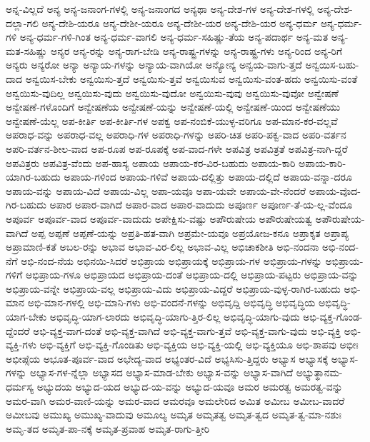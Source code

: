 {ಅನ್ನ-ವಿಲ್ಲದೆ
ಅನ್ಯ
ಅನ್ಯ-ಜನಾಂಗ-ಗಳಲ್ಲಿ
ಅನ್ಯ-ಜನಾಂಗದ
ಅನ್ಯಥಾ
ಅನ್ಯ-ದೇಶ-ಗಳ
ಅನ್ಯ-ದೇಶ-ಗಳಲ್ಲಿ
ಅನ್ಯ-ದೇಶ-ದಲ್ಲಾ-ಗಲಿ
ಅನ್ಯ-ದೇಶಿ-ಯರೂ
ಅನ್ಯ-ದೇಶೀ-ಯರೂ
ಅನ್ಯ-ದೇಶೀ-ಯರ
ಅನ್ಯ-ದೇಶಿ-ಯರ
ಅನ್ಯ-ಧರ್ಮ
ಅನ್ಯ-ಧರ್ಮ-ಗಳಿ
ಅನ್ಯ-ಧರ್ಮ-ಗಳಿ-ಗಿಂತ
ಅನ್ಯ-ಧರ್ಮ-ವಾಗಲಿ
ಅನ್ಯ-ಧರ್ಮ-ಸಹಿಷ್ಣು-ತೆಯ
ಅನ್ಯ-ಪದಾರ್ಥ
ಅನ್ಯ-ಮತ
ಅನ್ಯ-ಮತ-ಸಹಿಷ್ಣು
ಅನ್ಯರ
ಅನ್ಯ-ರನ್ನು
ಅನ್ಯ-ರಾಗ-ಬೇಡಿ
ಅನ್ಯ-ರಾಷ್ಟ್ರ-ಗಳನ್ನು
ಅನ್ಯ-ರಾಷ್ಟ್ರ-ಗಳು
ಅನ್ಯ-ರಿಂದ
ಅನ್ಯ-ರಿಗೆ
ಅನ್ಯರು
ಅನ್ಯರೋ
ಅನ್ಯಾ
ಅನ್ಯಾಯ-ಗಳನ್ನು
ಅನ್ಯಾಯ-ವಾಗಿಯೋ
ಅನ್ಯೋನ್ಯ
ಅನ್ವಯ-ವಾಗು-ತ್ತದೆ
ಅನ್ವಯಿಸ-ಬಹು-ದಾದ
ಅನ್ವಯಿಸ-ಬೇಕು
ಅನ್ವಯಿಸು-ತ್ತದೆ
ಅನ್ವಯಿಸು-ತ್ತವೆ
ಅನ್ವಯಿಸುವ
ಅನ್ವಯಿಸು-ವಂತ-ಹದು
ಅನ್ವಯಿಸು-ವಂತೆ
ಅನ್ವಯಿಸು-ವುದಿಲ್ಲ
ಅನ್ವಯಿಸು-ವುದು
ಅನ್ವಯಿಸು-ವುದೋ
ಅನ್ವಯಿಸು-ವುವು
ಅನ್ವಯಿಸು-ವುವೋ
ಅನ್ವೇಷಣೆ
ಅನ್ವೇಷಣೆ-ಗಳೊಂದಿಗೆ
ಅನ್ವೇಷಣೆಯ
ಅನ್ವೇಷಣೆ-ಯನ್ನು
ಅನ್ವೇಷಣೆ-ಯಲ್ಲಿ
ಅನ್ವೇಷಣೆ-ಯಿಂದ
ಅನ್ವೇಷಣೆಯು
ಅನ್ವೇಷಣೆ-ಯೆಲ್ಲ
ಅಪ-ಕೀರ್ತಿ
ಅಪ-ಕೀರ್ತಿ-ಗಳ
ಅಪಕ್ವ
ಅಪ-ನಂಬಿಕೆ-ಯುಳ್ಳ-ವರಿಗೂ
ಅಪ-ಮಾನ-ಕರ-ವಲ್ಲವೆ
ಅಪರಾಧ-ವನ್ನು
ಅಪರಾಧ-ವಲ್ಲ
ಅಪರಾಧಿ-ಗಳ
ಅಪರಾಧಿ-ಗಳನ್ನು
ಅಪರಿ-ಚಿತ
ಅಪರಿ-ಪಕ್ವ-ವಾದ
ಅಪರಿ-ವರ್ತನ
ಅಪರಿ-ವರ್ತನ-ಶೀಲ-ವಾದ
ಅಪ-ರೂಪ
ಅಪ-ರೂಪಕ್ಕೆ
ಅಪ-ವಾದ-ಗಳೇ
ಅಪವಿತ್ರ
ಅಪವಿತ್ರತೆ
ಅಪವಿತ್ರ-ನಾಗಿ-ದ್ದರೆ
ಅಪವಿತ್ರರು
ಅಪವಿತ್ರ-ವೆಂದು
ಅಪ-ಹಾಸ್ಯ
ಅಪಾಯ
ಅಪಾಯ-ಕರ-ವಿರ-ಬಹುದು
ಅಪಾಯ-ಕಾರಿ
ಅಪಾಯ-ಕಾರಿ-ಯಾಗಿರ-ಬಹುದು
ಅಪಾಯ-ಗಳಿಂದ
ಅಪಾಯ-ಗಳಿವೆ
ಅಪಾಯ-ದಲ್ಲಿತ್ತು
ಅಪಾಯ-ದಲ್ಲಿದೆ
ಅಪಾಯ-ವನ್ನಾ-ದರೂ
ಅಪಾಯ-ವನ್ನು
ಅಪಾಯ-ವಿದೆ
ಅಪಾಯ-ವಿಲ್ಲ
ಅಪಾ-ಯವೂ
ಅಪಾ-ಯವೇ
ಅಪಾಯ-ವೇ-ನೆಂದರೆ
ಅಪಾಯ-ವೊದ-ಗಿರ-ಬಹುದು
ಅಪಾರ
ಅಪಾರ-ವಾಗಿದೆ
ಅಪಾರ-ವಾದ
ಅಪಾರ-ವಾದುದು
ಅಪೂರ್ಣ
ಅಪೂರ್ಣ-ತೆ-ಯ-ಲ್ಲ-ವೆಂದೂ
ಅಪೂರ್ವ
ಅಪೂರ್ವ-ವಾದ
ಅಪೂರ್ವ-ವಾದುದು
ಅಪೇಕ್ಷಿಸು-ವಷ್ಟು
ಅಪೌರುಷೇಯ
ಅಪೌರುಷೇಯತ್ವ
ಅಪೌರುಷೇಯ-ವಾಗಿದೆ
ಅಪ್ಪ
ಅಪ್ಪಣೆ
ಅಪ್ಪಣೆ-ಯನ್ನು
ಅಪ್ರತಿ-ಹತ-ವಾಗಿ
ಅಪ್ರಮೇ-ಯವೂ
ಅಪ್ರಯೋಜ-ಕನೂ
ಅಪ್ರಾಕೃತ
ಅಪ್ರಾಪ್ಯ
ಅಪ್ರಾಮಾಣಿ-ಕತೆ
ಅಬಲ-ರನ್ನು
ಅಭಾವ
ಅಭಾವ-ವಿರ-ಲಿಲ್ಲ
ಅಭಾವ-ವಿಲ್ಲ
ಅಭಿಚಾಕಶೀತಿ
ಅಭಿ-ನಂದನಾ
ಅಭಿ-ನಂದ-ನೆಗೆ
ಅಭಿ-ನಂದ-ನೆಯ
ಅಭಿನಯಿ-ಸಿದರೆ
ಅಭಿಪ್ರಾಯ
ಅಭಿಪ್ರಾಯಕ್ಕೆ
ಅಭಿಪ್ರಾಯ-ಗಳ
ಅಭಿಪ್ರಾಯ-ಗಳನ್ನು
ಅಭಿಪ್ರಾಯ-ಗಳಿಗೆ
ಅಭಿಪ್ರಾಯ-ಗಳೂ
ಅಭಿಪ್ರಾಯದ
ಅಭಿಪ್ರಾಯ-ದಂತೆ
ಅಭಿಪ್ರಾಯ-ದಲ್ಲಿ
ಅಭಿಪ್ರಾಯ-ಪಟ್ಟರು
ಅಭಿಪ್ರಾಯ-ವನ್ನು
ಅಭಿಪ್ರಾಯ-ವನ್ನೇ
ಅಭಿಪ್ರಾಯ-ವಲ್ಲ
ಅಭಿಪ್ರಾಯ-ವಿದು
ಅಭಿಪ್ರಾಯ-ವಿದ್ದರೆ
ಅಭಿಪ್ರಾಯ-ವುಳ್ಳ-ರಾಗಿರ-ಬಹುದು
ಅಭಿ-ಮಾನ
ಅಭಿ-ಮಾನ-ಗಳಲ್ಲಿ
ಅಭಿ-ಮಾನಿ-ಗಳು
ಅಭಿ-ವಂದನೆ-ಗಳನ್ನು
ಅಭಿವೃದ್ದಿ
ಅಭಿವೃದ್ಧಿ
ಅಭಿವೃದ್ಧಿಯ
ಅಭಿವೃದ್ಧಿ-ಯಾಗ-ಬೇಕು
ಅಭಿವೃದ್ಧಿ-ಯಾಗ-ಲಾರದು
ಅಭಿವೃದ್ಧಿ-ಯಾಗು-ತ್ತಿರ-ಲಿಲ್ಲ
ಅಭಿವೃದ್ಧಿ-ಯಾಗು-ವುದು
ಅಭಿ-ವ್ಯಕ್ತ-ಗೊಂಡ-ದ್ದೆಂದರೆ
ಅಭಿ-ವ್ಯಕ್ತ-ವಾಗ-ದಂತೆ
ಅಭಿ-ವ್ಯಕ್ತ-ವಾಗಿದೆ
ಅಭಿ-ವ್ಯಕ್ತ-ವಾಗು-ತ್ತವೆ
ಅಭಿ-ವ್ಯಕ್ತ-ವಾಗು-ವುದು
ಅಭಿ-ವ್ಯಕ್ತಿ
ಅಭಿ-ವ್ಯಕ್ತಿ-ಗಳು
ಅಭಿ-ವ್ಯಕ್ತಿಗೆ
ಅಭಿ-ವ್ಯಕ್ತಿ-ಗೊಂಡಿತು
ಅಭಿ-ವ್ಯಕ್ತಿಯ
ಅಭಿ-ವ್ಯಕ್ತಿ-ಯಲ್ಲಿ
ಅಭಿ-ವ್ಯಕ್ತಿಯೂ
ಅಭಿ-ಶಾಪವು
ಅಭೀಃ
ಅಭೀಪ್ಸೆಯ
ಅಭೂತ-ಪೂರ್ವ-ವಾದ
ಅಭೇದ್ಯ-ವಾದ
ಅಭ್ಯಂತರ-ವಿದೆ
ಅಭ್ಯಸಿಸು-ತ್ತಿದ್ದರು
ಅಭ್ಯಾಸ
ಅಭ್ಯಾಸಕ್ಕೆ
ಅಭ್ಯಾಸ-ಗಳನ್ನು
ಅಭ್ಯಾಸ-ಗಳ-ನ್ನೆಲ್ಲಾ
ಅಭ್ಯಾಸದ
ಅಭ್ಯಾಸ-ಮಾಡ-ಬೇಕು
ಅಭ್ಯಾಸ-ವನ್ನು
ಅಭ್ಯಾಸ-ವಾಗಿದೆ
ಅಭ್ಯುತ್ಥಾನಮ-ಧರ್ಮಸ್ಯ
ಅಭ್ಯುದಯ
ಅಭ್ಯುದ-ಯದ
ಅಭ್ಯುದ-ಯ-ವನ್ನು
ಅಭ್ಯುದ-ಯವೂ
ಅಮರ
ಅಮರತ್ವ
ಅಮರತ್ವ-ವನ್ನು
ಅಮರ-ವಾಗಿ
ಅಮರ-ವಾಣಿ-ಯನ್ನು
ಅಮರ-ವಾದ
ಅಮರವೂ
ಅಮಲೇರಿದ
ಅಮಿತ
ಅಮೀಬ
ಅಮೀಬ-ವಾದರೆ
ಅಮೀಬವು
ಅಮುಖ್ಯ
ಅಮುಖ್ಯ-ವಾದುವು
ಅಮೂಲ್ಯ
ಅಮೃತ
ಅಮೃತತ್ವ
ಅಮೃತ-ತ್ವದ
ಅಮೃತ-ತ್ವ-ಮಾ-ನಶುಃ
ಅಮೃ-ತದ
ಅಮೃತ-ಪಾ-ನಕ್ಕೆ
ಅಮೃತ-ಪ್ರವಾಹ
ಅಮೃತ-ರಾಗು-ತ್ತೀರಿ
}
